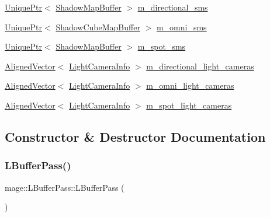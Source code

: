\begin{DoxyCompactItemize}
\item 
\hyperlink{namespacemage_a3316d7143a973e37adf1110f2e80ca31}{Unique\+Ptr}$<$ \hyperlink{structmage_1_1_shadow_map_buffer}{Shadow\+Map\+Buffer} $>$ \hyperlink{classmage_1_1_l_buffer_pass_ab1372d2fc5e0e716565f8d3d8eb6db97}{m\+\_\+directional\+\_\+sms}
\item 
\hyperlink{namespacemage_a3316d7143a973e37adf1110f2e80ca31}{Unique\+Ptr}$<$ \hyperlink{structmage_1_1_shadow_cube_map_buffer}{Shadow\+Cube\+Map\+Buffer} $>$ \hyperlink{classmage_1_1_l_buffer_pass_a083245bbfa560e2e16fd829a30ad857d}{m\+\_\+omni\+\_\+sms}
\item 
\hyperlink{namespacemage_a3316d7143a973e37adf1110f2e80ca31}{Unique\+Ptr}$<$ \hyperlink{structmage_1_1_shadow_map_buffer}{Shadow\+Map\+Buffer} $>$ \hyperlink{classmage_1_1_l_buffer_pass_a348d64fd92b6198663494d521edcdf6b}{m\+\_\+spot\+\_\+sms}
\item 
\hyperlink{namespacemage_a8664bfb5ce2179fc64eae9f82c8a5ba8}{Aligned\+Vector}$<$ \hyperlink{structmage_1_1_l_buffer_pass_1_1_light_camera_info}{Light\+Camera\+Info} $>$ \hyperlink{classmage_1_1_l_buffer_pass_ab6eead232cc2886b1d29e9f6cc45b16d}{m\+\_\+directional\+\_\+light\+\_\+cameras}
\item 
\hyperlink{namespacemage_a8664bfb5ce2179fc64eae9f82c8a5ba8}{Aligned\+Vector}$<$ \hyperlink{structmage_1_1_l_buffer_pass_1_1_light_camera_info}{Light\+Camera\+Info} $>$ \hyperlink{classmage_1_1_l_buffer_pass_ae8474ced9c3b762ffba3f1d859b9396a}{m\+\_\+omni\+\_\+light\+\_\+cameras}
\item 
\hyperlink{namespacemage_a8664bfb5ce2179fc64eae9f82c8a5ba8}{Aligned\+Vector}$<$ \hyperlink{structmage_1_1_l_buffer_pass_1_1_light_camera_info}{Light\+Camera\+Info} $>$ \hyperlink{classmage_1_1_l_buffer_pass_ae09a921906a3b53074b9d08c1594928f}{m\+\_\+spot\+\_\+light\+\_\+cameras}
\end{DoxyCompactItemize}


\subsection{Constructor \& Destructor Documentation}
\hypertarget{classmage_1_1_l_buffer_pass_acde2812780af700501ca945d62ed3dcc}{}\label{classmage_1_1_l_buffer_pass_acde2812780af700501ca945d62ed3dcc} 
\subsubsection{\texorpdfstring{L\+Buffer\+Pass()}{LBufferPass()}\hspace{0.1cm}{\footnotesize\ttfamily [1/3]}}
{\footnotesize\ttfamily mage\+::\+L\+Buffer\+Pass\+::\+L\+Buffer\+Pass (\begin{DoxyParamCaption}{ }\end{DoxyParamCaption})}

